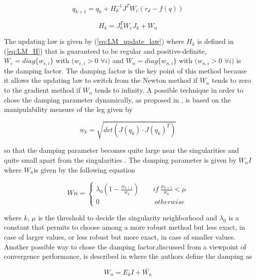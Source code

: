 \documentclass[a4paper]{article}
\begin{document}
\begin{equation}
q_{k+1} = q_k+H_k^{-1}J^TW_e(r_d-f(q))
\label{eq:LM_update_law}
\end{equation}

\begin{equation}
H_k = J_k^TW_eJ_k+W_n
\label{eq:LM_H}
\end{equation}

The updating law is given by (\ref{eq:LM_update_law}) where $H_k$ is defined in (\ref{eq:LM_H}) that is guaranteed to be regular and positive-definite,  $W_e = diag\{w_{e,i}\}$ with $(w_{e,i}>0$ $\forall i)$ and $W_n = diag\{w_{n,i}\}$ with $(w_{n,i}>0$ $\forall i)$ is the damping factor. 
The damping factor is the key point of this method because it allows the updating law to switch from the Newton method if $W_n$ tends to zero to the gradient method if $W_n$ tends to infinity. A possible technique in order to chose the damping parameter dynamically, as proposed in \cite{Kelmar},  is based on the manipulability measure of the leg given by

\begin{equation}
w_k=\sqrt{det(J(q_k)\cdot J(q_k)^T)}
\end{equation}

so that the damping parameter becomes quite large near the singularities and quite small apart from the singularities . The damping parameter is given by $W_nI$ where $W_n$is given by the following equation

\begin{equation}
  Wn = \begin{cases} \lambda_0 (1-\frac{w_{k+1}}{w_k})\quad \quad if  \> \frac{w_{k+1}}{w_k}<\mu \\
  0 \qquad \qquad \qquad \qquad otherwise\end{cases}
\end{equation}

where $k$, $\mu$ is the threshold to decide the singularity neighborhood and $\lambda_0$ is a constant that permits to choose among a more robust method but less exact, in case of larger values, or less robust but more exact, in case of smaller values. %
Another possible way to chose the damping factor,discussed from a viewpoint of convergence performance, is described in \cite{LMmethod} where the authors define the damping as 


\begin{equation}
W_n = E_kI+\bar{W_n}
\label{eq:dump_fact}
\end{equation} 
\end{document}
